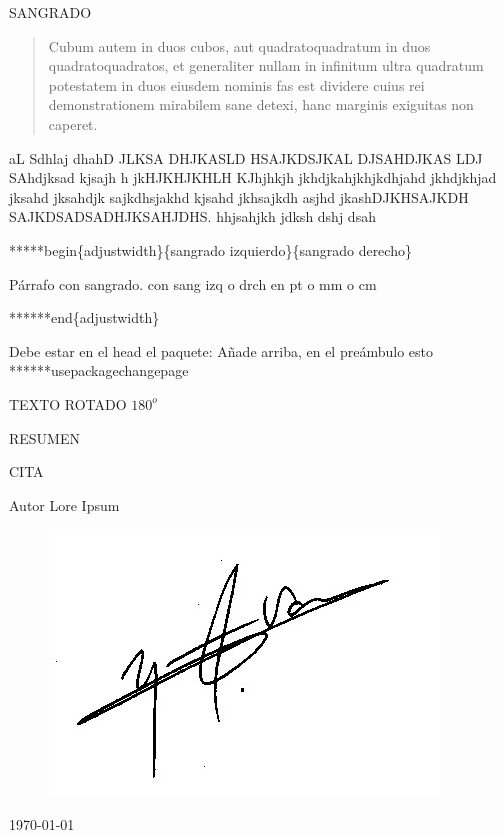 SANGRADO
\begin{quotation}
\begin{textit} %
Cubum autem in duos cubos, aut quadratoquadratum in duos quadratoquadratos, et
generaliter nullam in infinitum ultra quadratum potestatem in duos eiusdem nominis fas
est dividere cuius rei demonstrationem mirabilem sane detexi, hanc marginis exiguitas non
caperet.
\end{textit}
\end{quotation}


\begin{adjustwidth}{50pt}{0pt}
aL Sdhlaj dhahD JLKSA DHJKASLD HSAJKDSJKAL DJSAHDJKAS LDJ SAhdjksad kjsajh h jkHJKHJKHLH KJhjhkjh jkhdjkahjkhjkdhjahd jkhdjkhjad jksahd jksahdjk sajkdhsjakhd kjsahd jkhsajkdh asjhd jkashDJKHSAJKDH SAJKDSADSADHJKSAHJDHS. hhjsahjkh jdksh dshj dsah	

*****begin\{adjustwidth\}\{sangrado izquierdo\}\{sangrado derecho\}

Párrafo con sangrado.  con sang izq o drch en pt o mm o cm

******end\{adjustwidth\}

Debe estar en el head el paquete:  Añade arriba, en el preámbulo esto ******usepackage{changepage }
\end{adjustwidth}



TEXTO ROTADO $180^o$




RESUMEN

\begin{resumen}
	\lipsum[11]	
\end{resumen}




CITA

\begin{cita}{Autor Lore Ipsum}
	\lipsum[2]
\end{cita}


\vspace*{\fill}
\begin{center}
   \begin{figure}[H]
	\centering
	\includegraphics[width=.3
	\textwidth]{imagenes/firma.png}
	\end{figure}
\today{}
\end{center}
\vspace{3cm}

